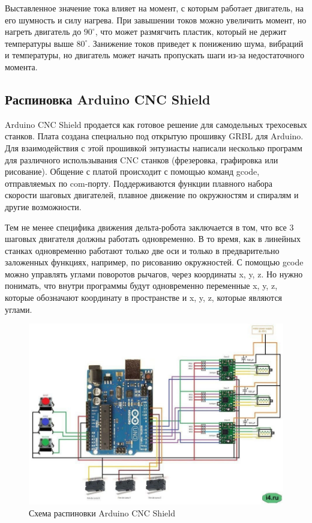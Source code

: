 Выставленное значение тока влияет на момент, с которым работает двигатель, на его шумность и силу нагрева. При завышении токов можно увеличить момент, но нагреть двигатель до $90^{\circ}$, что может размягчить пластик, который не держит температуры выше $80^{\circ}$. Занижение токов приведет к понижению шума, вибраций и температуры, но двигатель может начать пропускать шаги из-за недостаточного момента. 

\subsection{Распиновка Arduino CNC Shield}

Arduino CNC Shield продается как готовое решение для самодельных трехосевых станков. Плата создана специально под открытую прошивку GRBL для Arduino. Для взаимодействия с этой прошивкой энтузиасты написали несколько программ для различного использывания CNC станков (фрезеровка, графировка или рисование). Общение с платой происходит с помощью команд gcode, отправляемых по com-порту. Поддерживаются функции плавного набора скорости шаговых двигателей, плавное движение по окружностям и спиралям и другие возможности.

Тем не менее специфика движения дельта-робота заключается в том, что все 3 шаговых двигателя должны работать одновременно. В то время, как в линейных станках одновременно работают только две оси и только в предварительно заложенных функциях, например, по рисованию окружностей. С помощью gcode можно управлять углами поворотов рычагов, через координаты x, y, z. Но нужно понимать, что внутри программы будут одновременно переменные x, y, z, которые обозначают координату в пространстве и x, y, z, которые являются углами.   

\begin{figure}[h]
\centering
\includegraphics[width=0.8\linewidth]{./image/shield}
\caption{Схема распиновки Arduino CNC Shield}
\end{figure}

